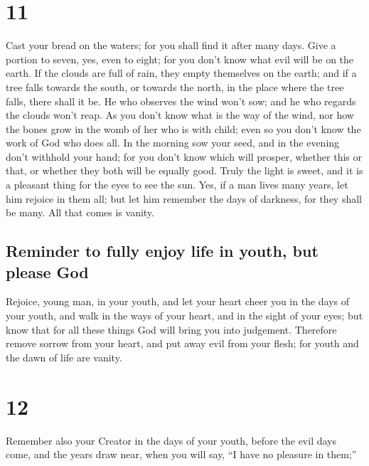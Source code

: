 \hypertarget{section-10}{%
\section{11}\label{section-10}}

 Cast your bread on the waters; for you shall find it
after many days.  Give a portion to seven, yes, even to
eight; for you don't know what evil will be on the earth. 
If the clouds are full of rain, they empty themselves on the earth; and
if a tree falls towards the south, or towards the north, in the place
where the tree falls, there shall it be.  He who observes
the wind won't sow; and he who regards the clouds won't reap.
 As you don't know what is the way of the wind, nor how
the bones grow in the womb of her who is with child; even so you don't
know the work of God who does all.  In the morning sow
your seed, and in the evening don't withhold your hand; for you don't
know which will prosper, whether this or that, or whether they both will
be equally good.  Truly the light is sweet, and it is a
pleasant thing for the eyes to see the sun.  Yes, if a man
lives many years, let him rejoice in them all; but let him remember the
days of darkness, for they shall be many. All that comes is vanity.

\hypertarget{reminder-to-fully-enjoy-life-in-youth-but-please-god}{%
\subsection{Reminder to fully enjoy life in youth, but please
God}\label{reminder-to-fully-enjoy-life-in-youth-but-please-god}}

 Rejoice, young man, in your youth, and let your heart
cheer you in the days of your youth, and walk in the ways of your heart,
and in the sight of your eyes; but know that for all these things God
will bring you into judgement.  Therefore remove sorrow
from your heart, and put away evil from your flesh; for youth and the
dawn of life are vanity.

\hypertarget{section-11}{%
\section{12}\label{section-11}}

 Remember also your Creator in the days of your youth,
before the evil days come, and the years draw near, when you will say,
``I have no pleasure in them;''

